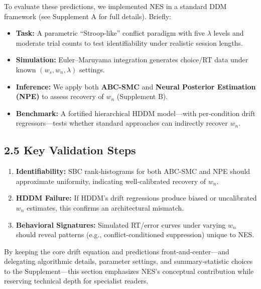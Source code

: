 \documentclass[
  11pt,
]{article}
\providecommand{\tightlist}{%
  \setlength{\itemsep}{0pt}\setlength{\parskip}{0pt}}
\begin{document}
To evaluate these predictions, we implemented NES in a standard DDM
framework (see Supplement A for full details). Briefly:

\begin{itemize}
\tightlist
\item
  \textbf{Task:} A parametric ``Stroop-like'' conflict paradigm with
  five \(\lambda\) levels and moderate trial counts to test
  identifiability under realistic session lengths.\\
\item
  \textbf{Simulation:} Euler--Maruyama integration generates choice/RT
  data under known \((w_s,w_n,\lambda)\) settings.\\
\item
  \textbf{Inference:} We apply both \textbf{ABC-SMC} and \textbf{Neural
  Posterior Estimation (NPE)} to assess recovery of \(w_n\) (Supplement
  B).\\
\item
  \textbf{Benchmark:} A fortified hierarchical HDDM model---with
  per-condition drift regressors---tests whether standard approaches can
  indirectly recover \(w_n\).
\end{itemize}

\subsection{2.5 Key Validation Steps}\label{key-validation-steps}

\begin{enumerate}
\def\labelenumi{\arabic{enumi}.}
\tightlist
\item
  \textbf{Identifiability:} SBC rank‐histograms for both ABC-SMC and NPE
  should approximate uniformity, indicating well-calibrated recovery of
  \(w_n\).\\
\item
  \textbf{HDDM Failure:} If HDDM's drift regressions produce biased or
  uncalibrated \(w_n\) estimates, this confirms an architectural
  mismatch.\\
\item
  \textbf{Behavioral Signatures:} Simulated RT/error curves under
  varying \(w_n\) should reveal patterns (e.g., conflict-conditioned
  suppression) unique to NES.
\end{enumerate}

By keeping the core drift equation and predictions
front-and-center---and delegating algorithmic details, parameter
settings, and summary‐statistic choices to the Supplement---this section
emphasizes NES's conceptual contribution while reserving technical depth
for specialist readers.
\end{document}
